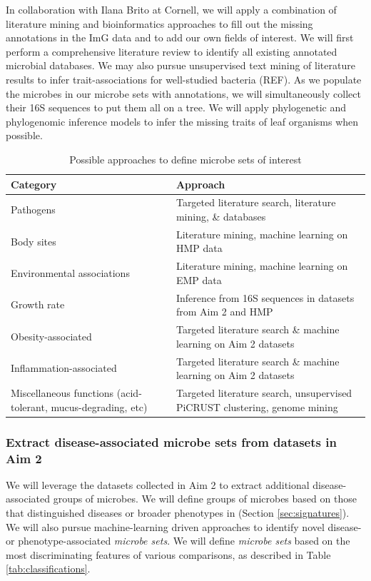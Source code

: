 \documentclass[12pt]{article}
\begin{document}
In collaboration with Ilana Brito at Cornell, we will apply a combination of literature mining and bioinformatics approaches to fill out the missing annotations in the ImG data and to add our own fields of interest. We will first perform a comprehensive literature review to identify all existing annotated microbial databases. We may also pursue unsupervised text mining of literature results to infer trait-associations for well-studied bacteria (REF). As we populate the microbes in our microbe sets with annotations, we will simultaneously collect their 16S sequences to put them all on a tree. We will apply phylogenetic and phylogenomic inference models to infer the missing traits of leaf organisms when possible.

\begin{table}
\begin{tabular}{|p{6cm}|p{10cm}|}
	\hline
	\textbf{Category} & \textbf{Approach} \\
	\hline
	Pathogens & Targeted literature search, literature mining, \& databases \\
	\hline
	Body sites & Literature mining, machine learning on HMP data \\
	\hline
	Environmental associations & Literature mining, machine learning on EMP data \\
	\hline
	Growth rate & Inference from 16S sequences in datasets from Aim 2 and HMP \\
	\hline
	Obesity-associated & Targeted literature search \& machine learning on Aim 2 datasets \\
	\hline
	Inflammation-associated & Targeted literature search \& machine learning on Aim 2 datasets \\
	\hline
	Miscellaneous functions (acid-tolerant, mucus-degrading, etc) & Targeted literature search, unsupervised PiCRUST clustering, genome mining \\
	\hline 
\end{tabular}
\caption{Possible approaches to define microbe sets of interest}\label{tab:microbe_set_categories}
\end{table}


\subsubsection{Extract disease-associated microbe sets from datasets in Aim 2}
We will leverage the datasets collected in Aim 2 to extract additional disease-associated groups of microbes. We will define groups of microbes based on those that distinguished diseases or broader phenotypes in (Section \ref{sec:signatures}). We will also pursue machine-learning driven approaches to identify novel disease- or phenotype-associated \textit{microbe sets}. We will define \textit{microbe sets} based on the most discriminating features of various comparisons, as described in Table \ref{tab:classifications}.
\end{document}
